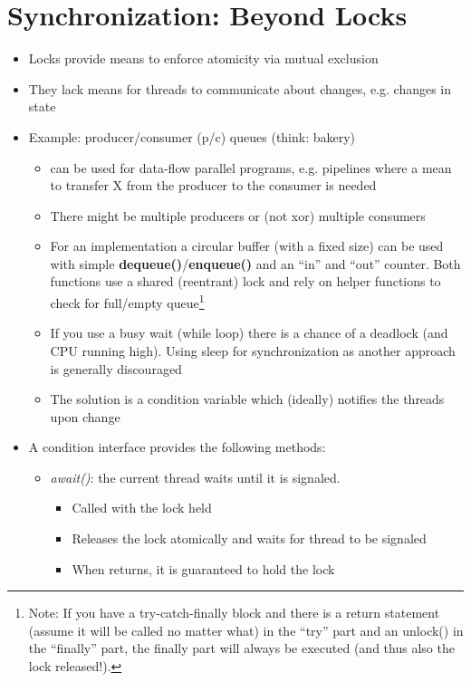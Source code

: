\documentclass[a4paper]{article}
\begin{document}
\setcounter{section}{10}%
\section{Synchronization: Beyond Locks}
\begin{itemize}
\item Locks provide means to enforce atomicity via mutual exclusion 
\item They lack means for threads to communicate about changes, e.g. changes in state
\item Example: producer/consumer (p/c) queues (think: bakery)
\begin{itemize}
\item can be used for data-flow parallel programs, e.g. pipelines where a mean to transfer X from the producer to the consumer is needed
\item There might be multiple producers or (not xor) multiple consumers
\item For an implementation a circular buffer (with a fixed size) can be used with simple \textbf{dequeue()}/\textbf{enqueue()} and an “in” and “out” counter. Both functions use a shared (reentrant) lock and rely on helper functions to check for full/empty queue\footnote{Note: If you have a try-catch-finally block and there is a return statement (assume it will be called no matter what) in the ``try'' part and an unlock() in the ``finally'' part, the finally part will always be executed (and thus also the lock released!).}
\item If you use a busy wait (while loop) there is a chance of a deadlock (and CPU running high). Using sleep for synchronization as another approach is generally discouraged
\item The solution is a condition variable which (ideally) notifies the threads upon change
\end{itemize}
\item A condition interface provides the following methods:
\begin{itemize}
\item \textsl{await()}: the current thread waits until it is signaled. 
\begin{itemize}
\item Called with the lock held
\item Releases the lock atomically and waits for thread to be signaled
\item When returns, it is guaranteed to hold the lock

\end{itemize}
\end{itemize}
\end{itemize}
\end{document}
